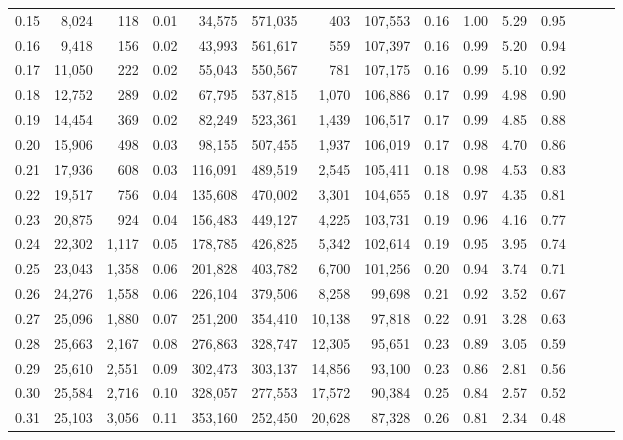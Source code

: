 \begin{tabular}{rrrrrrrrrrrrrrr}
0.15 &   8,024 &    118 &  0.01 &   34,575 &  571,035 &      403 &  107,553 &  0.16 &  1.00 &  5.29 &      0.95 \\
0.16 &   9,418 &    156 &  0.02 &   43,993 &  561,617 &      559 &  107,397 &  0.16 &  0.99 &  5.20 &      0.94 \\
0.17 &  11,050 &    222 &  0.02 &   55,043 &  550,567 &      781 &  107,175 &  0.16 &  0.99 &  5.10 &      0.92 \\
0.18 &  12,752 &    289 &  0.02 &   67,795 &  537,815 &    1,070 &  106,886 &  0.17 &  0.99 &  4.98 &      0.90 \\
0.19 &  14,454 &    369 &  0.02 &   82,249 &  523,361 &    1,439 &  106,517 &  0.17 &  0.99 &  4.85 &      0.88 \\
0.20 &  15,906 &    498 &  0.03 &   98,155 &  507,455 &    1,937 &  106,019 &  0.17 &  0.98 &  4.70 &      0.86 \\
0.21 &  17,936 &    608 &  0.03 &  116,091 &  489,519 &    2,545 &  105,411 &  0.18 &  0.98 &  4.53 &      0.83 \\
0.22 &  19,517 &    756 &  0.04 &  135,608 &  470,002 &    3,301 &  104,655 &  0.18 &  0.97 &  4.35 &      0.81 \\
0.23 &  20,875 &    924 &  0.04 &  156,483 &  449,127 &    4,225 &  103,731 &  0.19 &  0.96 &  4.16 &      0.77 \\
0.24 &  22,302 &  1,117 &  0.05 &  178,785 &  426,825 &    5,342 &  102,614 &  0.19 &  0.95 &  3.95 &      0.74 \\
0.25 &  23,043 &  1,358 &  0.06 &  201,828 &  403,782 &    6,700 &  101,256 &  0.20 &  0.94 &  3.74 &      0.71 \\
0.26 &  24,276 &  1,558 &  0.06 &  226,104 &  379,506 &    8,258 &   99,698 &  0.21 &  0.92 &  3.52 &      0.67 \\
0.27 &  25,096 &  1,880 &  0.07 &  251,200 &  354,410 &   10,138 &   97,818 &  0.22 &  0.91 &  3.28 &      0.63 \\
0.28 &  25,663 &  2,167 &  0.08 &  276,863 &  328,747 &   12,305 &   95,651 &  0.23 &  0.89 &  3.05 &      0.59 \\
0.29 &  25,610 &  2,551 &  0.09 &  302,473 &  303,137 &   14,856 &   93,100 &  0.23 &  0.86 &  2.81 &      0.56 \\
0.30 &  25,584 &  2,716 &  0.10 &  328,057 &  277,553 &   17,572 &   90,384 &  0.25 &  0.84 &  2.57 &      0.52 \\
0.31 &  25,103 &  3,056 &  0.11 &  353,160 &  252,450 &   20,628 &   87,328 &  0.26 &  0.81 &  2.34 &      0.48 \\

\end{tabular}
